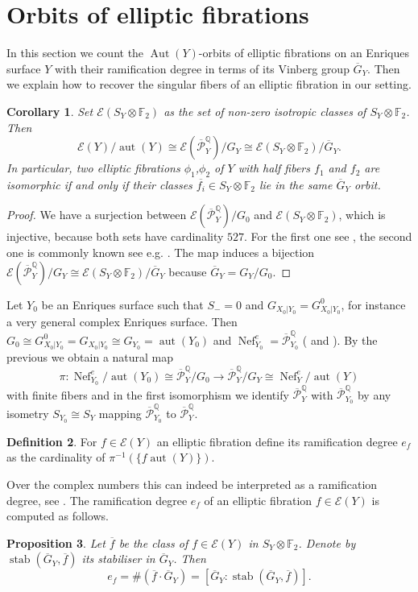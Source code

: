\documentclass{amsart}
\theoremstyle{definition}
\newtheorem{definition}{Definition}[section]
\theoremstyle{plain}
\newtheorem{proposition}[definition]{Proposition}
\newtheorem{corollary}[definition]{Corollary}
\DeclareMathOperator{\Nef}{Nef}
\DeclareMathOperator{\Aut}{Aut}
\DeclareMathOperator{\aut}{aut}
\DeclareMathOperator{\stab}{stab}
\newcommand{\FF}{\mathbb{F}}
\newcommand{\E}{\mathcal{E}}
\renewcommand{\P}{\mathcal{P}}
\newcommand{\Gbar}{\overline{G}}
\newcommand{\Pbar}{\overline{\P}^\mathbb{Q}}
\begin{document}
\section{Orbits of elliptic fibrations} \label{sect:orbits-fibrations}
In this section we count the $\Aut(Y)$-orbits of elliptic fibrations on an Enriques surface $Y$ with their ramification degree in terms of its Vinberg group $\Gbar_Y$. Then we explain how to recover the singular fibers of an elliptic fibration in our setting.

\begin{corollary}\label{prop:EYbar/GYbar}
Set $\E(S_Y \otimes \FF_2)$ as the set of non-zero isotropic classes of $S_Y\otimes \FF_2$.
Then
\[\E(Y)/\aut(Y) \cong \E(\Pbar_Y)/G_Y \cong \E(S_Y \otimes \FF_2)/\Gbar_Y.\]
In particular, two elliptic fibrations $\phi_1$,$\phi_2$ of $Y$ with half fibers $f_1$ and $f_2$ are isomorphic if and only if their classes
$\overline{f_i} \in S_Y\otimes \FF_2$ lie in the same $\Gbar_Y$ orbit.
\end{corollary}
\begin{proof}
We have a surjection between $\E(\Pbar_Y)/G_0$ and $\E(S_Y \otimes \FF_2)$, which is injective, because both sets have cardinality $527$. For the first one see \cite[p. 397, table]{barth-peters:very_general_enriques}, the second one is commonly known see e.g. \cite[(13.1)]{kneser}. The map
induces a bijection $\E(\Pbar_Y)/G_Y \cong \E(S_Y \otimes \FF_2)/\Gbar_Y$
because $\Gbar_Y= G_Y/G_0$.
\end{proof}

Let $Y_0$ be an Enriques surface such that $S_-=0$ and $G_{X_0|Y_0}=G_{X_0|Y_0}^0$, for instance a very general complex Enriques surface.
Then $G_0 \cong G_{X_0|Y_0}^0 = G_{X_0|Y_0} \cong G_{Y_0}=\aut(Y_0)$ and $\Nef^{e}_{Y_0}= \Pbar_{Y_0}$ (\cite[Section 0]{barth-peters:very_general_enriques} and \cite{martin:automorphisms_of_unnodal_enriques_surfaces}).
By the previous  we obtain a natural map
\[\pi\colon \Nef^{e}_{Y_0}/\aut(Y_0)\cong\Pbar_Y/G_0 \to \Pbar_Y/G_Y \cong \Nef^{e}_Y/\aut(Y)\]
with finite fibers and in the first isomorphism we identify $\Pbar_Y$ with $\Pbar_{Y_0}$ by any isometry $S_{Y_0}\cong S_Y$ mapping $\Pbar_{Y_0}$ to $\Pbar_Y$.
\begin{definition}\label{def:ramificaton}
For $f \in \E(Y)$ an elliptic fibration define its ramification degree $e_f$ as the cardinality of $\pi^{-1}(\{f\aut(Y)\})$.
\end{definition}
Over the complex numbers this can indeed be interpreted as a ramification degree, see .
The ramification degree $e_f$ of an elliptic fibration $f \in \E(Y)$ is computed as follows.
\begin{proposition}
 Let $\overline{f}$ be the class of $f \in \E(Y)$ in $S_Y \otimes \FF_2$. Denote by $\stab(\Gbar_Y,\overline{f})$ its stabiliser in $\Gbar_Y$. Then
 \[e_f = \#\left( \overline{f} \cdot \Gbar_Y \right)= [\Gbar_Y:\stab(\Gbar_Y,\overline{f})].\]
\end{proposition}
\end{document}
